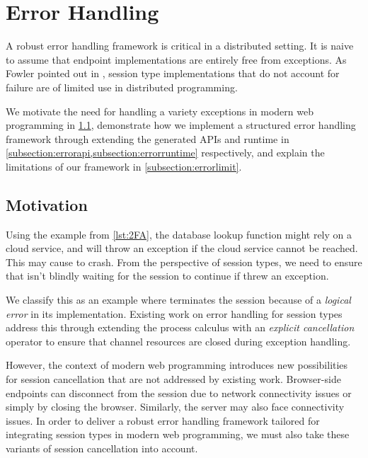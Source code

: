 \section{Error Handling}
\label{section:error}

A robust error handling framework is critical
in a distributed setting.
It is naive to assume that endpoint implementations
are entirely free from exceptions.
As Fowler pointed out in \cite{Exceptional},
session type implementations that do not account for failure
are of limited use in distributed programming.

We motivate the need for handling a variety exceptions in
modern web programming in \cref{subsection:errormotivation},
demonstrate how we implement a structured error handling
framework through extending the generated APIs and 
runtime in \cref{subsection:errorapi,subsection:errorruntime}
respectively, and explain the limitations of our framework
in \cref{subsection:errorlimit}.

\subsection{Motivation}
\label{subsection:errormotivation}

Using the  example from
\cref{lst:2FA}, the database lookup function
might rely on a cloud service, and will throw an exception
if the cloud service cannot be reached.
This may cause  to crash.
From the perspective of session types, we need to
ensure that  isn't blindly
waiting for the session to continue if 
threw an exception.

We classify this as an example where 
terminates the session because of a \textit{logical error}
in its implementation.
Existing work \cite{Exceptional,AffineSessions} 
on error handling for session types address this
through extending the process calculus with an
\textit{explicit cancellation} operator to ensure that
channel resources are closed during exception handling.

However, the context of modern web programming
introduces new possibilities for session cancellation
that are not addressed by existing work.
Browser-side endpoints can disconnect from the session due
to network connectivity issues or simply by closing
the browser. Similarly, the server may also face connectivity
issues. In order to deliver a robust error handling
framework tailored for integrating session types in 
modern web programming, we must also take these variants
of session cancellation into account.

